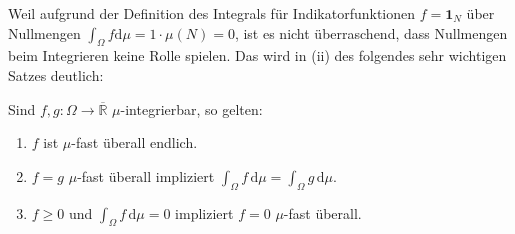 Weil aufgrund der Definition des Integrals f\"ur Indikatorfunktionen $f=\mathbf 1_N$ \"uber Nullmengen $\int_\Omega f \mathrm{d} \mu=1\cdot \mu(N)=0$, ist es nicht \"uberraschend, dass Nullmengen beim Integrieren keine Rolle spielen. Das wird in (ii) des folgendes sehr wichtigen Satzes deutlich:
\begin{satz}\label{S7}
	Sind $f,g \colon \Omega \rightarrow \overline{\mathbb{R}}$ $\mu$-integrierbar, so gelten:
	\begin{enumerate}[label=(\roman*)]
		\item $f$ ist $\mu$-fast überall endlich.
		\item $f=g$ $\mu$-fast überall impliziert
		$ \int_{\Omega} f \,\mathrm{d}\mu = \int_{\Omega} g\, \mathrm{d}\mu.$
		\item $f \geq 0$ und $ \int_{\Omega} f\, \mathrm{d} \mu=0$ impliziert $f = 0$ $\mu$-fast überall.
	\end{enumerate}
\end{satz}

